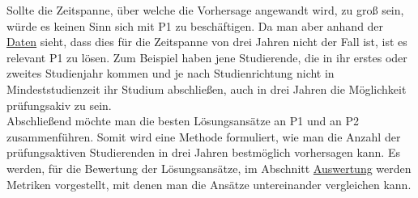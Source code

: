 Sollte die Zeitspanne, \"uber welche die Vorhersage angewandt wird, zu gro{\ss} sein, w\"urde es keinen Sinn sich mit P1 zu besch\"aftigen. 
Da man aber anhand der \hyperref[sec:daten]{Daten} sieht, dass dies f\"ur 
die Zeitspanne von drei Jahren nicht der Fall ist, ist es relevant P1 zu l\"osen. Zum Beispiel haben jene Studierende, die in ihr erstes oder zweites Studienjahr kommen und je nach Studienrichtung
nicht in Mindeststudienzeit ihr Studium abschlie{\ss}en, auch in drei Jahren die M\"oglichkeit pr\"ufungsakiv zu sein. \\

Abschlie{\ss}end m\"ochte man die besten L\"osungsans\"atze an P1 und an P2 zusammenf\"uhren. Somit wird eine Methode formuliert, wie man 
die Anzahl der pr\"ufungsaktiven Studierenden in drei Jahren bestm\"oglich vorhersagen kann. Es werden, f\"ur die Bewertung der L\"osungsans\"atze, 
im Abschnitt \hyperref[sec:auswertung]{Auswertung} werden Metriken vorgestellt, mit denen man die Ans\"atze untereinander vergleichen kann.